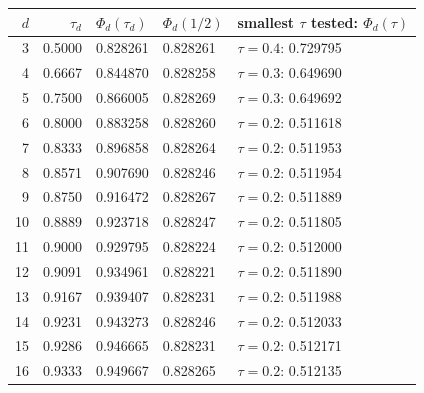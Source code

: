 \begin{tabular}{r r l l l}
\toprule
$d$ & $\tau_d$ & $\Phi_d(\tau_d)$ & $\Phi_d(1/2)$ & smallest $\tau$ tested: $\Phi_d(\tau)$ \\
\midrule
3 & 0.5000 & 0.828261 & 0.828261 & $\tau=0.4$: 0.729795 \\
4 & 0.6667 & 0.844870 & 0.828258 & $\tau=0.3$: 0.649690 \\
5 & 0.7500 & 0.866005 & 0.828269 & $\tau=0.3$: 0.649692 \\
6 & 0.8000 & 0.883258 & 0.828260 & $\tau=0.2$: 0.511618 \\
7 & 0.8333 & 0.896858 & 0.828264 & $\tau=0.2$: 0.511953 \\
8 & 0.8571 & 0.907690 & 0.828246 & $\tau=0.2$: 0.511954 \\
9 & 0.8750 & 0.916472 & 0.828267 & $\tau=0.2$: 0.511889 \\
10 & 0.8889 & 0.923718 & 0.828247 & $\tau=0.2$: 0.511805 \\
11 & 0.9000 & 0.929795 & 0.828224 & $\tau=0.2$: 0.512000 \\
12 & 0.9091 & 0.934961 & 0.828221 & $\tau=0.2$: 0.511890 \\
13 & 0.9167 & 0.939407 & 0.828231 & $\tau=0.2$: 0.511988 \\
14 & 0.9231 & 0.943273 & 0.828246 & $\tau=0.2$: 0.512033 \\
15 & 0.9286 & 0.946665 & 0.828231 & $\tau=0.2$: 0.512171 \\
16 & 0.9333 & 0.949667 & 0.828265 & $\tau=0.2$: 0.512135 \\
\bottomrule
\end{tabular}

